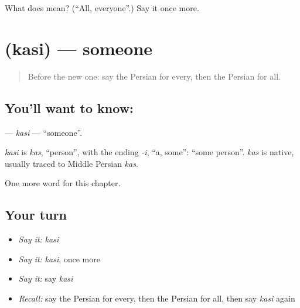 \begin{tcolorbox}[breakable,colback=teal!4,colframe=teal!35!black,title={Before you move on}]
What does  mean? (\textquotedblleft{}All, everyone\textquotedblright{}.) Say it once more.
\end{tcolorbox}
\section[\texorpdfstring{\fa{کسی} (kasi)}{کسی (kasi)}]{ (kasi) — someone}

\label{lesson:FA-C84-kasi}



\begin{quote}
Before the new one: say the Persian for every, then the Persian for all.
\end{quote}

\subsection*{You'll want to know: }
\textbf{} — \emph{kasi} — \textquotedblleft{}someone\textquotedblright{}.

\begin{cousinweb}
\emph{kasi} is \emph{kas}, \textquotedblleft{}person\textquotedblright{}, with the ending \emph{-i}, \textquotedblleft{}a, some\textquotedblright{}: \textquotedblleft{}some person\textquotedblright{}. \emph{kas} is native, usually traced to Middle Persian \emph{kas}.
\end{cousinweb}

\begin{grammarlens}[title={What you've built}]
One more word for this chapter.
\end{grammarlens}

\subsection*{Your turn}
\begin{itemize}
\raggedright
  \item \emph{Say it:} \emph{kasi}
  \item \emph{Say it:} \emph{kasi}, once more
  \item \emph{Say it:} say \emph{kasi}
  \item \emph{Recall:} say the Persian for every, then the Persian for all, then say \emph{kasi} again
\end{itemize}

